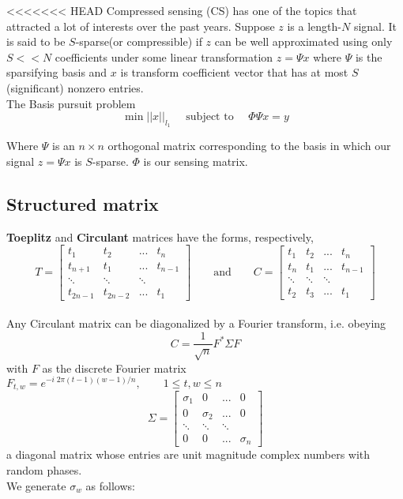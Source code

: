 <<<<<<< HEAD
Compressed sensing (CS) has one of the topics that attracted a lot of interests over the past years. Suppose $z$ is a length-$N$ signal. It is said to be $S$-sparse(or compressible) if $z$ can be well approximated using only $S << N$ coefficients under some linear transformation
$ z=\Psi x $
where $\Psi$ is the sparsifying basis and $x$ is transform coefficient vector that has at most $S$(significant) nonzero entries.
\\

The Basis pursuit problem 
\begin{equation}
\min ||x||_{l_1} \quad \text{ subject to } \quad \Phi \Psi x=y
\end{equation}


Where $\Psi$ is an $n \times n$ orthogonal matrix corresponding to the basis in which our signal $z = \Psi x$ is $S$-sparse. $\Phi$ is our sensing matrix. 
\\
\subsection*{Structured matrix}
\textbf{Toeplitz} and \textbf{Circulant} matrices have the forms, respectively,
\\

$$
T = \begin{bmatrix}
t_{1}    & t_{2}    & ...    & t_{n}   \\[0.3em]
t_{n+1}  & t_{1}    & ...    & t_{n-1} \\[0.3em]
\ddots   & \ddots   & \ddots &         \\[0.3em]
t_{2n-1} & t_{2n-2} & ...    & t_{1}         
\end{bmatrix}
\qquad \text{and} \qquad
C = \begin{bmatrix}
t_{1}  & t_{2}  & ...    & t_{n}   \\[0.3em]
t_{n}  & t_{1}  & ...    & t_{n-1} \\[0.3em]
\ddots & \ddots & \ddots &         \\[0.3em]
t_{2}  & t_{3}  & ...    & t_{1}        
\end{bmatrix} 
$$
\\
	Any Circulant matrix can be diagonalized by a Fourier transform, i.e. obeying
	$$ C=\frac{1}{\sqrt{n}} F^* \Sigma F $$ with $F$ as the discrete Fourier matrix
	$F_{t,w}=e^{-i\; 2\pi(t-1)(w-1)/n}, \qquad 1 \le t,w \le n$
	$$
	\Sigma = \begin{bmatrix}
	\sigma_{1} & 0 & ...& 0           \\[0.3em]
	0 & \sigma_{2} & ... & 0 \\[0.3em]
	\ddots &\ddots & \ddots &      \\[0.3em]
	0 & 0 & ... & \sigma_{n}        
	\end{bmatrix} $$
	a diagonal matrix whose entries are unit magnitude complex numbers with random phases.
\\
	We generate $\sigma_{w}$ as follows:
	\\[1em]
	
